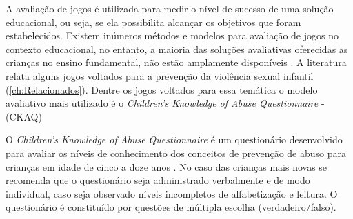 

A avaliação de jogos é utilizada para medir o nível de sucesso de uma solução educacional, ou seja, se ela possibilita alcançar os objetivos que foram estabelecidos. Existem inúmeros métodos e modelos para avaliação de jogos no contexto educacional, no entanto, a maioria das soluções avaliativas oferecidas as crianças no ensino fundamental, não estão amplamente disponíveis \cite{tutty2019children}. A literatura relata alguns jogos voltados para a prevenção da violência sexual infantil (\autoref{ch:Relacionados}). Dentre os jogos voltados para essa temática o modelo avaliativo mais utilizado é o \textit{Children’s Knowledge of Abuse Questionnaire} - (CKAQ)%

\vspace{-0.1cm}

O \textit{Children’s Knowledge of Abuse Questionnaire} é um questionário desenvolvido para avaliar os níveis de conhecimento dos conceitos de prevenção de abuso para crianças em idade de cinco a doze anos \cite{tutty1992ability}. No caso das crianças mais novas se recomenda que o questionário seja administrado verbalmente e de modo individual, caso seja observado níveis incompletos de alfabetização e leitura. O questionário é constituído por questões de múltipla escolha (verdadeiro/falso).

